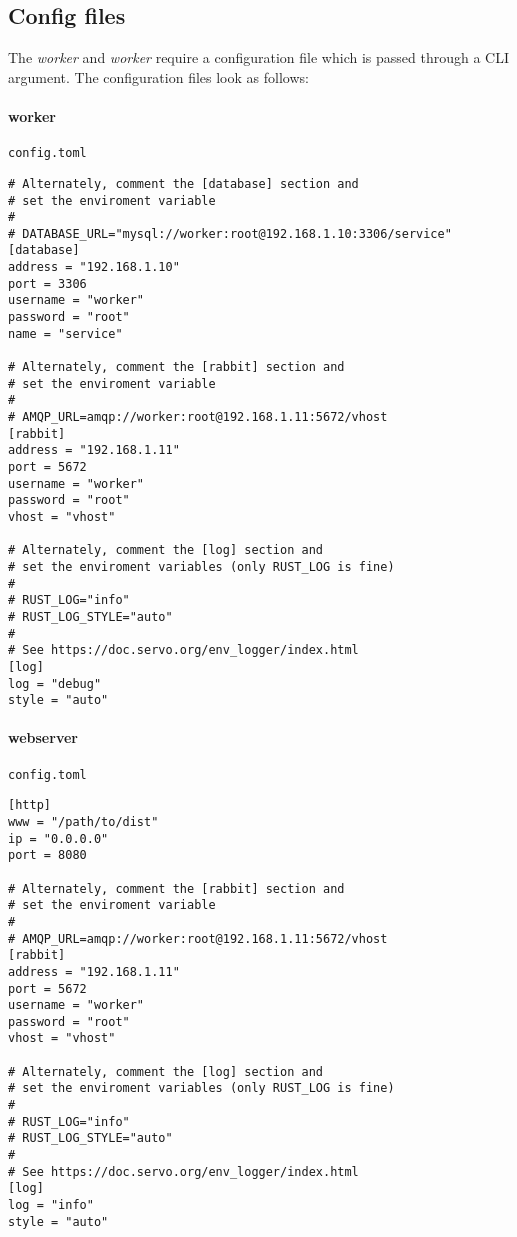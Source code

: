 \documentclass[../documentation.tex]{subfiles}
\begin{document}
\pagebreak

\subsection{Config files}

The \textit{worker} and \textit{worker} require a configuration
file which is passed through a CLI argument.
The configuration files look as follows:

\paragraph{worker} \texttt{config.toml}

\begin{lstlisting}[style=toml, numbers=none]
# Alternately, comment the [database] section and
# set the enviroment variable
#
# DATABASE_URL="mysql://worker:root@192.168.1.10:3306/service"
[database]
address = "192.168.1.10"
port = 3306
username = "worker"
password = "root"
name = "service"

# Alternately, comment the [rabbit] section and
# set the enviroment variable
#
# AMQP_URL=amqp://worker:root@192.168.1.11:5672/vhost
[rabbit]
address = "192.168.1.11"
port = 5672
username = "worker"
password = "root"
vhost = "vhost"

# Alternately, comment the [log] section and
# set the enviroment variables (only RUST_LOG is fine)
#
# RUST_LOG="info"
# RUST_LOG_STYLE="auto"
#
# See https://doc.servo.org/env_logger/index.html
[log]
log = "debug"
style = "auto"
\end{lstlisting}

\pagebreak

\paragraph{webserver} \texttt{config.toml}

\begin{lstlisting}[style=toml, numbers=none]
[http]
www = "/path/to/dist"
ip = "0.0.0.0"
port = 8080

# Alternately, comment the [rabbit] section and
# set the enviroment variable
#
# AMQP_URL=amqp://worker:root@192.168.1.11:5672/vhost
[rabbit]
address = "192.168.1.11"
port = 5672
username = "worker"
password = "root"
vhost = "vhost"

# Alternately, comment the [log] section and
# set the enviroment variables (only RUST_LOG is fine)
#
# RUST_LOG="info"
# RUST_LOG_STYLE="auto"
#
# See https://doc.servo.org/env_logger/index.html
[log]
log = "info"
style = "auto"
\end{lstlisting}
\end{document}
